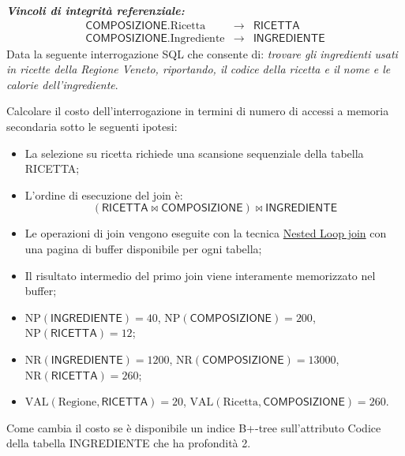 \documentclass[a4paper]{article}
\begin{document}
	\noindent
	\emph{\textbf{Vincoli di integrità referenziale:}}
	\begin{equation*}
		\begin{array}{lll}
			\textsf{COMPOSIZIONE}.\text{Ricetta} 		&\rightarrow& \textsf{RICETTA} \\ [0.3em]
			\textsf{COMPOSIZIONE}.\text{Ingrediente} 	&\rightarrow& \textsf{INGREDIENTE}
		\end{array}
	\end{equation*}
	Data la seguente interrogazione SQL che consente di: \emph{trovare gli ingredienti usati in ricette della Regione Veneto, riportando, il codice della ricetta e il nome e le calorie dell'ingrediente}.
	
	Calcolare il costo dell'interrogazione in termini di numero di accessi a memoria secondaria sotto le seguenti ipotesi:
	\begin{itemize}
		\item La selezione su ricetta richiede una scansione sequenziale della tabella \textsf{RICETTA};
		
		\item L'ordine di esecuzione del join è:
		\begin{equation*}
			\left(\textsf{RICETTA} \Join \textsf{COMPOSIZIONE}\right) \Join \textsf{INGREDIENTE}
		\end{equation*}
		
		\item Le operazioni di join vengono eseguite con la tecnica \underline{Nested Loop join} con una pagina di buffer disponibile per ogni tabella;
		
		\item Il risultato intermedio del primo join viene interamente memorizzato nel buffer;
		
		\item $\mathrm{NP}\left(\textsf{INGREDIENTE}\right) = 40$, $\mathrm{NP}\left(\textsf{COMPOSIZIONE}\right) = 200$, $\mathrm{NP}\left(\textsf{RICETTA}\right) = 12$;
		
		\item $\mathrm{NR}\left(\textsf{INGREDIENTE}\right) = 1200$, $\mathrm{NR}\left(\textsf{COMPOSIZIONE}\right) = 13000$, $\mathrm{NR}\left(\textsf{RICETTA}\right) = 260$;
		
		\item $\mathrm{VAL}\left(\text{Regione}, \textsf{RICETTA}\right) = 20$, $\mathrm{VAL}\left(\text{Ricetta}, \textsf{COMPOSIZIONE}\right) = 260$.
	\end{itemize}
	Come cambia il costo se è disponibile un indice B+-tree sull'attributo Codice della tabella INGREDIENTE che ha profondità 2.\newpage
	
\end{document}
